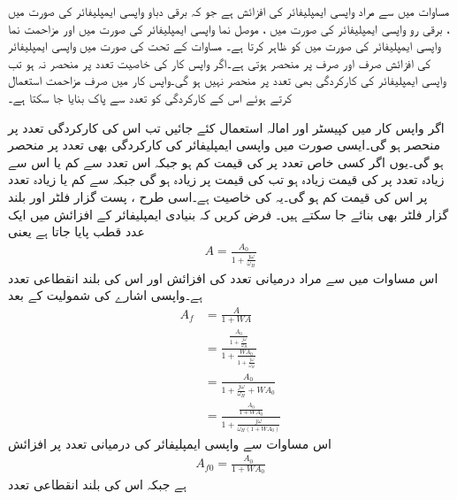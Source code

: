مساوات  میں  سے مراد واپسی ایمپلیفائر کی افزائش ہے جو کہ برقی دباو واپسی ایمپلیفائر کی صورت میں
 ، برقی رو واپسی ایمپلیفائر کی صورت میں ، موصل نما واپسی ایمپلیفائر کی صورت میں  اور مزاحمت نما واپسی ایمپلیفائر کی صورت میں  کو ظاہر کرتا ہے۔
مساوات  کے تحت  کی صورت میں واپسی ایمپلیفائر کی افزائش صرف اور صرف  پر منحصر ہوتی ہے۔اگر واپس کار کی خاصیت تعدد پر منحصر نہ ہو تب واپسی ایمپلیفائر کی کارکردگی بھی تعدد پر منحصر نہیں ہو گی۔واپس کار میں صرف مزاحمت استعمال کرتے ہوئے اس کے کارکردگی کو تعدد سے پاک بنایا جا سکتا ہے۔

اگر واپس کار میں کپیسٹر اور امالہ استعمال کئے جائیں تب اس کی کارکردگی تعدد پر منحصر ہو گی۔ایسی صورت میں واپسی ایمپلیفائر کی کارکردگی بھی تعدد پر منحصر ہو گی۔یوں اگر کسی خاص تعدد  پر  کی قیمت کم ہو جبکہ اس تعدد سے کم یا اس سے زیادہ تعدد پر   کی قیمت زیادہ ہو تب  کی قیمت  پر زیادہ ہو گی جبکہ  سے کم یا زیادہ تعدد پر اس کی قیمت کم ہو گی۔یہ  کی خاصیت ہے۔اسی طرح ، پست گزار فلٹر اور بلند گزار فلٹر بھی بنائے جا سکتے ہیں۔
فرض کریں کہ بنیادی ایمپلیفائر کے افزائش میں ایک عدد قطب پایا جاتا ہے یعنی
\begin{align*}
A=\frac{A_0}{1+\frac{j \omega }{\omega_H}}
\end{align*}
اس مساوات میں  سے مراد درمیانی تعدد کی افزائش اور  اس کی بلند انقطاعی تعدد ہے۔واپسی اشارے کی شمولیت کے بعد
\begin{align*}
A_f&=\frac{A}{1+W A}\\
&=\frac{\frac{A_0}{1+\frac{j \omega }{\omega_H}}}{1+\frac{W A_0}{1+\frac{j \omega }{\omega_H}}}\\
&=\frac{A_0}{1+\frac{j \omega}{\omega_H}+W A_0}\\
&= \frac{\frac{A_0}{1+W A_0}}{1+\frac{j \omega}{\omega_H \left(1+W A_0 \right)}}
\end{align*}
اس مساوات سے واپسی ایمپلیفائر کی درمیانی تعدد پر افزائش
\begin{align}
A_{f0}=\frac{A_0}{1+W A_0}
\end{align}
ہے جبکہ اس کی بلند انقطاعی تعدد
